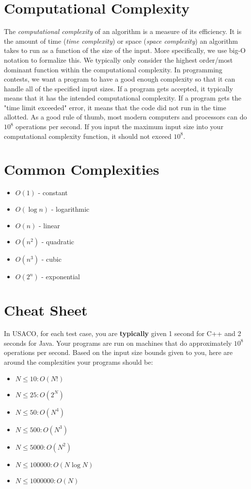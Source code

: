 \documentclass{article}
\begin{document}
\section{Computational Complexity}
The \emph{computational complexity} of an algorithm is a measure of its efficiency. It is the amount of time (\emph{time complexity}) or space (\emph{space complexity}) an algorithm takes to run as a function of the size of the input. More specifically, we use big-O notation to formalize this. We typically only consider the highest order/most dominant function within the computational complexity. In programming contests, we want a program to have a good enough complexity so that it can handle all of the specified input sizes. If a program gets accepted, it typically means that it has the intended computational complexity. If a program gets the "time limit exceeded" error, it means that the code did not run in the time allotted. As a good rule of thumb, most modern computers and processors can do $10^8$ operations per second. If you input the maximum input size into your computational complexity function, it should not exceed $10^8$.

\section{Common Complexities}
\begin{itemize}
\item $O(1)$ - constant
\item $O(\log n)$ - logarithmic
\item $O(n)$ - linear
\item $O(n^{2})$ - quadratic
\item $O(n^{3})$ - cubic
\item $O(2^{n})$ - exponential
\end{itemize}

\section{Cheat Sheet}
In USACO, for each test case, you are \textbf{typically} given 1 second for C++ and 2 seconds for Java. Your programs are run on machines that do approximately $10^{8}$ operations per second. Based on the input size bounds given to you, here are around the complexities your programs should be:
\begin{itemize}
\item $N \le 10: O(N!)$
\item $N \le 25: O(2^{N})$
\item $N \le 50: O(N^{4})$
\item $N \le 500: O(N^{3})$
\item $N \le 5000: O(N^{2})$
\item $N \le 100000: O(N \log N)$
\item $N \le 1000000: O(N)$
\end{itemize}
\end{document}
